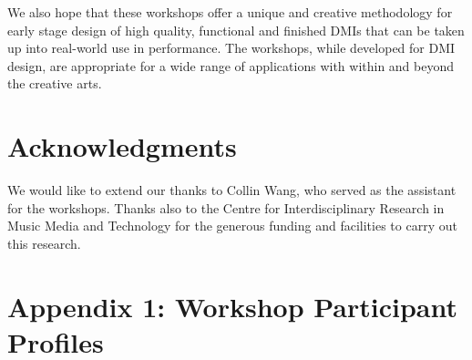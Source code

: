 \documentclass[letterpaper, 12pt]{article}
\begin{document}
We also hope that these workshops offer a unique and creative methodology for early stage design of high quality, functional and finished DMIs that can be taken up into real-world use in performance. The workshops, while developed for DMI design, are appropriate for a wide range of applications with within and beyond the creative arts. 

\section{Acknowledgments}

We would like to extend our thanks to Collin Wang, who served as the assistant for the workshops. Thanks also to the Centre for Interdisciplinary Research in Music Media and Technology for the generous funding and facilities to carry out this research.







\pagebreak

\section*{Appendix 1: Workshop Participant Profiles}
\end{document}

